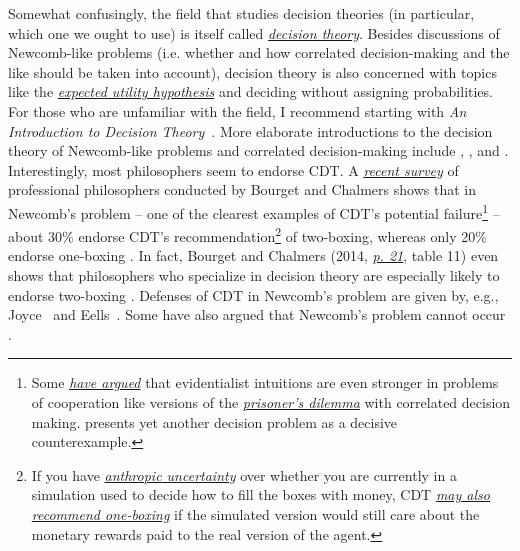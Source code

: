 Somewhat confusingly, the field that studies decision theories (in
particular, which one we ought to use) is itself called
\href{https://en.wikipedia.org/wiki/Decision_theory}{\emph{decision
theory}}. Besides discussions of Newcomb-like problems (i.e. whether
and how correlated decision-making and the like should be taken into
account), decision theory is also concerned with topics like the
\href{https://en.wikipedia.org/wiki/Expected_utility_hypothesis}{\emph{expected
utility hypothesis}} and deciding without assigning probabilities. For
those who are unfamiliar with the field, I recommend starting with \emph{An Introduction to Decision
Theory}~\parencite{Peterson2017-pa}. More elaborate introductions to the decision theory of
Newcomb-like problems and correlated decision-making include \parencite{Ahmed2014-ec},
\parencite{Yudkowsky2010-ky}, and
\parencite{Almond2010-xn}.\\[2\baselineskip]Interestingly,
most philosophers seem to endorse CDT. A
\href{http://philpapers.org/archive/BOUWDP}{\emph{recent survey}} of
professional philosophers conducted by Bourget and Chalmers shows that
in Newcomb's problem -- one of the clearest examples of CDT's potential
failure\footnote{Some
  \href{https://sl4librarian.files.wordpress.com/2016/12/newcomb-hurley.pdf}{\emph{have
  argued}} that evidentialist intuitions are even stronger in problems
  of cooperation like versions of the
  \href{https://en.wikipedia.org/wiki/Prisoner\%27s_dilemma}{\emph{prisoner's
  dilemma}} with correlated decision making.
  \parencite{Egan2007-ey} presents yet another decision
  problem as a decisive counterexample.} -- about 30\% endorse CDT's
recommendation\footnote{If you have
  \href{http://www.anthropic-principle.com/?q=book/table_of_contents}{\emph{anthropic
  uncertainty}} over whether you are currently in a simulation used to
  decide how to fill the boxes with money, CDT
  \href{http://lesswrong.com/lw/asi/anthropic_reasoning_by_cdt_in_newcombs_problem/}{\emph{may
  also}} \href{http://www.scottaaronson.com/blog/?p=30}{\emph{recommend
  one-boxing}} if the simulated version would still care about the
  monetary rewards paid to the real version of the agent.} of
two-boxing, whereas only 20\% endorse one-boxing
\parencite{Bourget2014-fm}. In fact, Bourget and Chalmers
(2014, \href{http://philpapers.org/archive/BOUWDP\#page=21}{\emph{p.
21}}, table 11) even shows that philosophers who specialize in decision
theory are especially likely to endorse two-boxing
\parencite{Bourget2014-fm}. Defenses of CDT in Newcomb's
problem are given by, e.g., Joyce~\parencite{Joyce1999-iv} and
Eells~\parencite{Eells2016-ym}. Some have also argued that
Newcomb's problem cannot occur
\parencite{Binmore2007-uc,Ledwig2000-vp}.

